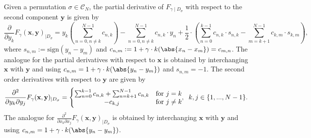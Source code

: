 \begin{Prop}
    Given a permutation $\sigma \in \mathcal{C}_N$, the partial derivative of $F_{\gamma \mid D_{\sigma}}$ with respect to the second component $\textbf{y}$ is given by
    \begin{equation*}
        \frac{\partial}{\partial y_k}F_{\gamma}(\textbf{x},\textbf{y})_{\mid D_{\sigma}} = y_k \left( \sum_{n=0, n\neq k}^{N-1} c_{n,k} \right) - \sum_{n=0, n\neq k}^{N-1} c_{n,k} \cdot y_n + \frac{1}{2}\cdot \left( \sum_{n=0}^{k-1} c_{n,k} \cdot s_{n,k} - \sum_{m=k+1}^{N-1} c_{k,m} \cdot s_{k,m} \right),
    \end{equation*}
    where $s_{n,m} := \text{sign}(y_n-y_m)$ and $c_{n,m} := 1 + \gamma \cdot k(\abs{x_n-x_m}) = c_{m,n}$.
    The analogue for the partial derivatives with respect to $\textbf{x}$ is obtained by interchanging $\textbf{x}$ with $\textbf{y}$ and using $c_{n,m} = 1 + \gamma \cdot k(\abs{y_n-y_m})$ and $s_{n,m} = -1$.
    The second order derivatives with respect to $\textbf{y}$ are given by
    \begin{equation*}
        \frac{\partial^2}{\partial y_k \partial y_j}F_{\gamma}(\textbf{x},\textbf{y})_{\mid D_{\sigma}} = \Bigg\{ 
        \begin{matrix}
            \sum_{n=0}^{k-1} c_{n,k} + \sum_{n=k+1}^{N-1} c_{n,k} & \text{for } j=k \\
            -c_{k,j} & \text{for } j\neq k
        \end{matrix}
        , \hspace{2mm} k,j \in \{ 1,...,N-1 \}.
    \end{equation*}
    The analogue for $\frac{\partial^2}{\partial x_k \partial x_j}F_{\gamma}(\textbf{x},\textbf{y})_{\mid D_{\sigma}}$ is obtained by interchanging $\textbf{x}$ with $\textbf{y}$ and using $c_{n,m} = 1 + \gamma \cdot k(\abs{y_n-y_m})$.
\end{Prop}

